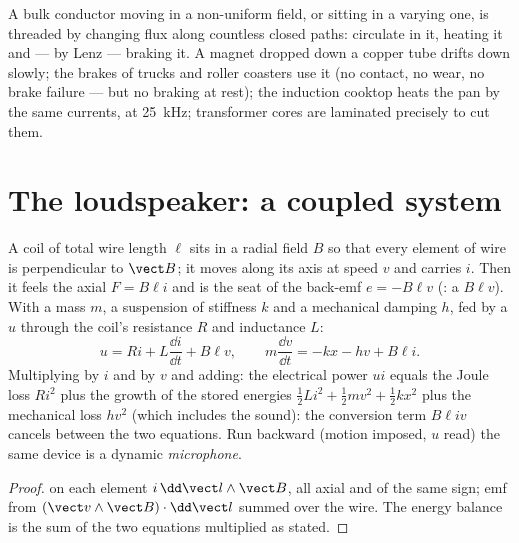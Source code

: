 \begin{example}\label{ex:b1:induction:eddy}
A bulk conductor moving in a non-uniform field, or sitting in a
varying one, is threaded by changing flux along countless closed paths:
\emph{} circulate in it, heating it and --- by Lenz ---
braking it. A magnet dropped down a copper tube drifts down slowly; the
brakes of trucks and roller coasters use it (no contact, no wear, no
brake failure --- but no braking at rest); the induction cooktop heats
the pan by the same currents, at \qty{25}{kHz}; transformer cores are
laminated precisely to cut them.
\end{example}

\section{The loudspeaker: a coupled system}

\begin{proposition}\label{prop:b1:induction:loudspeaker}
A coil of total wire length $\ell$ sits in a radial field $B$ so that
every element of wire is perpendicular to $\vect B$; it moves along its
axis at speed $v$ and carries $i$. Then it feels the axial 
$F = B\ell i$ and is the seat of the back-emf $e = -B\ell v$ (: a  $B\ell v$). With a mass $m$, a suspension of
stiffness $k$ and a mechanical damping $h$, fed by a  $u$ through
the coil's resistance $R$ and inductance $L$:
\[
u = Ri + L\frac{\dd i}{\dd t} + B\ell v , \qquad
m\frac{\dd v}{\dd t} = -kx - hv + B\ell i .
\]
Multiplying by $i$ and by $v$ and adding: the electrical power $ui$
equals the Joule loss $Ri^2$ plus the growth of the stored energies
$\tfrac12Li^2 + \tfrac12mv^2 + \tfrac12kx^2$ plus the mechanical loss
$hv^2$ (which includes the sound): the conversion term $B\ell iv$ cancels
between the two equations. Run backward (motion imposed, $u$ read) the
same device is a dynamic \emph{microphone}.
\end{proposition}

\begin{proof}
 on each element $i\,\dd\vect l\wedge\vect B$, all axial and
of the same sign; emf from $(\vect v\wedge\vect B)\cdot\dd\vect l$ summed
over the wire. The energy balance is the sum of the two equations
multiplied as stated.
\end{proof}

